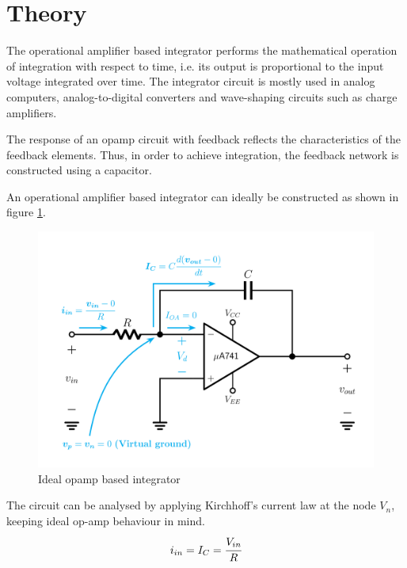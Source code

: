 \documentclass[12pt, titlepage]{article}
\theoremstyle{definition}
\begin{document}
  \newpage
  \section{Theory}
    The operational amplifier based integrator performs the mathematical operation of integration with respect to time, i.e. its output is proportional to the input voltage integrated over time.
    The integrator circuit is mostly used in analog computers, analog-to-digital converters and wave-shaping circuits such as charge amplifiers.

    The response of an opamp circuit with feedback reflects the characteristics of the feedback elements. Thus, in order to achieve integration, the feedback network is constructed using a capacitor.

    An operational amplifier based integrator can ideally be constructed as shown in figure \ref{fig:theoretical_ideal_integrator}.

    \begin{figure}[h]
      \centering
      \includegraphics[scale=0.25]{images/ideal_integrator.png}
      \caption{Ideal opamp based integrator}
      \label{fig:theoretical_ideal_integrator}
    \end{figure}

    The circuit can be analysed by applying Kirchhoff's current law at the node $V_n$, keeping ideal op-amp behaviour in mind.
    \begin{equation}\label{eq:ideal_kcl_vn}
      i_{in} = I_C = \cfrac{V_{in}}{R}
    \end{equation}
\end{document}
